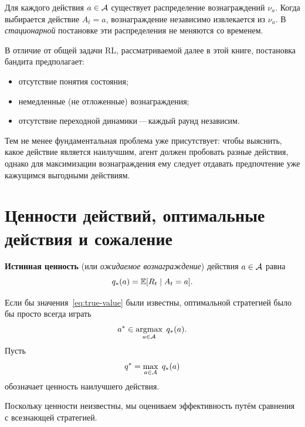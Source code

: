 Для каждого действия $a\in\mathcal{A}$ существует распределение вознаграждений $\nu_a$.  Когда выбирается действие $A_t=a$, вознаграждение независимо извлекается из $\nu_a$.  В \emph{стационарной} постановке эти распределения не меняются со временем.

В отличие от общей задачи RL, рассматриваемой далее в этой книге, постановка бандита предполагает:
\begin{itemize}[leftmargin=*]
\item отсутствие понятия состояния;
\item немедленные (не отложенные) вознаграждения;
\item отсутствие переходной динамики\,---\,каждый раунд независим.
\end{itemize}

Тем не менее фундаментальная проблема уже присутствует: чтобы выяснить, какое действие является наилучшим, агент должен пробовать разные действия, однако для максимизации вознаграждения ему следует отдавать предпочтение уже кажущимся выгодными действиям.


\section{Ценности действий, оптимальные действия и сожаление}
\label{sec:action-values-regret}

\begin{definition}
\label{def:action-value-bandit}
\textbf{Истинная ценность} (или \emph{ожидаемое вознаграждение}) действия $a\in\mathcal{A}$ равна
\begin{equation}
\label{eq:true-value}
q_*(a) = \operatorname{\mathbb{E}}[R_t \mid A_t = a].
\end{equation}
\end{definition}

Если бы значения~\eqref{eq:true-value} были известны, оптимальной стратегией было бы просто всегда играть
\begin{equation}
\label{eq:optimal-action}
a^* \in \operatorname*{argmax}_{a\in\mathcal{A}}\; q_*(a).
\end{equation}
Пусть
\begin{equation}
\label{eq:optimal-value}
q^* = \max_{a\in\mathcal{A}}\; q_*(a)
\end{equation}
обозначает ценность наилучшего действия.

Поскольку ценности неизвестны, мы оцениваем эффективность путём сравнения с всезнающей стратегией.

